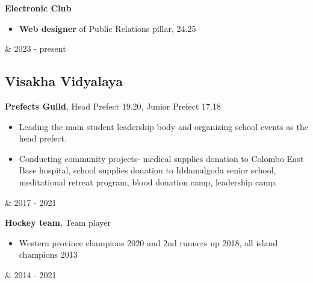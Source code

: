 \documentclass[10pt, a4paper]{article}
\newenvironment{highlights}{
        \begin{itemize}[
                topsep=0pt,
                parsep=0.10 cm,
                partopsep=0pt,
                itemsep=0pt,
                after=\vspace{-1\baselineskip},
                leftmargin=0.4 cm + 3pt
            ]
    }{
        \end{itemize}
    } %
\let\originalTabularx\tabularx
\let\originalEndTabularx\endtabularx
\renewenvironment{tabularx}{\bgroup\centering\originalTabularx}{\originalEndTabularx\par\egroup}
\begin{document}
           \vspace{0.2 cm}
		\begin{tabularx}{\textwidth-0.4 cm-0.13cm}{K{0.2 cm} R{4.1 cm}}
            \textbf{Electronic Club}
            \vspace{0.10 cm}
            \begin{highlights}
            \item \textbf{Web designer} of Public Relations pillar, 24.25
	        \end{highlights}
            &
            2023 - present
           \end{tabularx}
			
		

	\subsection{Visakha Vidyalaya}
		\begin{tabularx}{\textwidth-0.4 cm-0.13cm}{K{0.2 cm} R{4.1 cm}}
            \textbf{Prefects Guild}, Head Prefect 19.20, Junior Prefect 17.18
            \vspace{0.10 cm}
            \begin{highlights}
            \item Leading the main student leadership body and organizing school events as the head prefect.
		\item Conducting community projects- medical supplies donation to Colombo East Base hospital, school supplies donation to Iddamalgoda senior school, meditational retreat program, blood donation camp, leadership camp.
            \end{highlights}
            &
            2017 - 2021
           \end{tabularx}
			
		\vspace{0.2 cm}
		\begin{tabularx}{\textwidth-0.4 cm-0.13cm}{K{0.2 cm} R{4.1 cm}}
            \textbf{Hockey team}, Team player
            \vspace{0.10 cm}
            \begin{highlights}
	        \item Western province champions 2020 and 2nd runners up 2018, all island champions 2013
	        \end{highlights}
            &
            2014 - 2021
           \end{tabularx}
			
\end{document}
